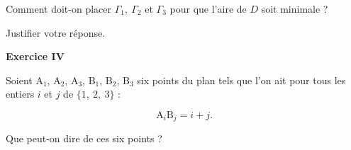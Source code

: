 \documentclass[a4paper,11pt]{article}
\begin{document}
Comment doit-on placer $\Gamma_1, \: \Gamma_2$ et $\Gamma_3$ pour que l'aire de $D$ soit minimale ? 

Justifier votre réponse.

\begin{center}\textbf{{\color{blue} Exercice IV}}
\end{center}

\medskip

Soient A$_1$, A$_2$, A$_3$, B$_1$, B$_2$, B$_3$ six points du plan tels que l'on ait pour tous les entiers $i$ et $j$ de $\{1,\: 2,\: 3\}$ :

\[\text{A}_i\text{B}_j = i + j.\]

Que peut-on dire de ces six points ?
\end{document}
